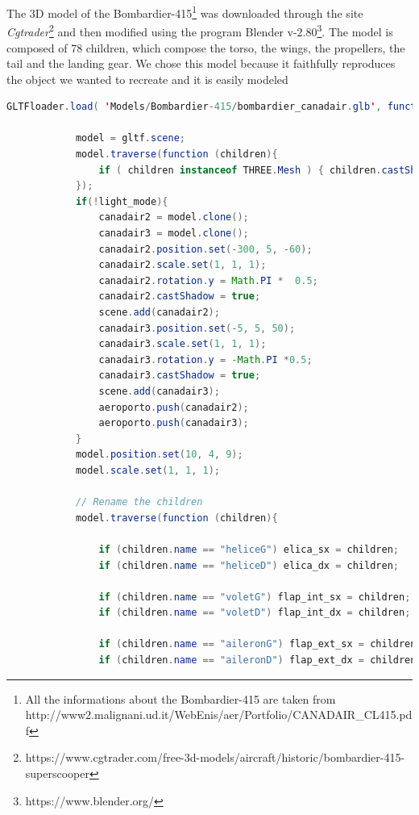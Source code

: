 \documentclass{article}
\begin{document}
The 3D model of the Bombardier-415\footnote{All the informations about the Bombardier-415 are taken from http://www2.malignani.ud.it/WebEnis/aer/Portfolio/CANADAIR\_CL415.pdf} was downloaded through the site \textit{Cgtrader}\footnote{https://www.cgtrader.com/free-3d-models/aircraft/historic/bombardier-415-superscooper} and then modified using the program Blender v-2.80\footnote{https://www.blender.org/}. The model is composed of 78 children, which compose the torso, the wings, the propellers, the tail and the landing gear. We chose this model because it faithfully reproduces the object we wanted to recreate and it is easily modeled

\newpage

\begin{lstlisting}[language=Java, caption=Bombardier-415 loader]
GLTFloader.load( 'Models/Bombardier-415/bombardier_canadair.glb', function ( gltf ) {

            model = gltf.scene;
            model.traverse(function (children){
				if ( children instanceof THREE.Mesh ) { children.castShadow = true; }
            });
            if(!light_mode){
                canadair2 = model.clone();
                canadair3 = model.clone();
                canadair2.position.set(-300, 5, -60);
                canadair2.scale.set(1, 1, 1);
                canadair2.rotation.y = Math.PI *  0.5;
                canadair2.castShadow = true;
                scene.add(canadair2);
                canadair3.position.set(-5, 5, 50);
                canadair3.scale.set(1, 1, 1);
                canadair3.rotation.y = -Math.PI *0.5;
                canadair3.castShadow = true;
                scene.add(canadair3);
                aeroporto.push(canadair2);
                aeroporto.push(canadair3);
            }
            model.position.set(10, 4, 9);
            model.scale.set(1, 1, 1);

            // Rename the children
            model.traverse(function (children){

                if (children.name == "heliceG") elica_sx = children;
                if (children.name == "heliceD") elica_dx = children;

                if (children.name == "voletG") flap_int_sx = children;
                if (children.name == "voletD") flap_int_dx = children;

                if (children.name == "aileronG") flap_ext_sx = children;
                if (children.name == "aileronD") flap_ext_dx = children;


\end{lstlisting}
\end{document}
